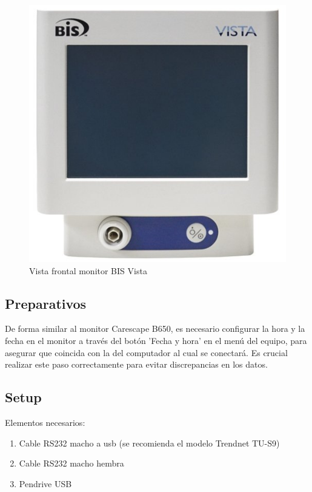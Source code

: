 \documentclass{article}
\begin{document}
\begin{figure}[h]
	\centering
	\includegraphics[scale=0.2]{img/bis_vista.png}
	\caption{Vista frontal monitor BIS Vista}
	\label{fig:bis_frontal}
\end{figure}



\subsection{Preparativos}
De forma similar al monitor Carescape B650, es necesario configurar la hora y la fecha en el monitor a través del botón 'Fecha y hora' en el menú del equipo, para asegurar que coincida con la del computador al cual se conectará. Es crucial realizar este paso correctamente para evitar discrepancias en los datos.

\subsection{Setup}

Elementos necesarios:

\begin{enumerate}
	\item Cable RS232 macho a usb (se recomienda el modelo Trendnet TU-S9)
	\item Cable RS232 macho hembra
	\item Pendrive USB 
\end{enumerate}
\end{document}
